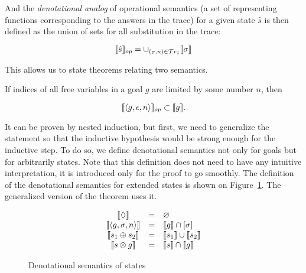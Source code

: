 And the \emph{denotational analog} of operational semantics (a set of representing functions corresponding to the answers in the trace) for a given state $\hat{s}$ is
then defined as the union of sets for all substitution in the trace:

\[
\llbracket{\hat{s}}\rrbracket_{op} = \cup_{(\sigma, n) \in \mathcal{T}r_{\hat{s}}} \llbracket{\sigma}\rrbracket
\]

\begin{comment}
In \textsc{Coq} we again use a proposition instead:

\begin{lstlisting}[language=Coq]
   Definition in_denotational_analog
      (t : trace) (f : repr_fun) : Prop :=
      exists s n, in_stream (Answer s n) t /\
             in_denotational_sem_subst s f.
   Notation "{| t , f |}" := (in_denotational_analog t f).
\end{lstlisting}
\end{comment}

This allows us to state theorems relating two semantics.

\begin{theorem}
\label{lem:soundness}
If indices of all free variables in a goal $g$ are limited by some number $n$, then

\[
\llbracket{\left<{g, \epsilon, n}\right>}\rrbracket_{op} \subset \llbracket{g}\rrbracket.
\]
\end{theorem}

It can be proven by nested induction, but first, we need to generalize the statement so that the inductive hypothesis would be strong enough for the inductive step.
To do so, we define denotational semantics not only for goals but for arbitrarily states. Note that this definition does not need to have any intuitive
interpretation, it is introduced only for the proof to go smoothly. The definition of the denotational semantics for extended states is shown on Figure~\ref{denotational_semantics_of_states}.
The generalized version of the theorem uses it.

\begin{figure}[t]
  \[
  \begin{array}{ccl}
    \llbracket{\Diamond}\rrbracket&=&\varnothing\\
    \llbracket{\left<{g, \sigma, n}\right>}\rrbracket&=&\llbracket{g}\rrbracket\cap[\sigma]\\
    \llbracket{s_1 \oplus s_2}\rrbracket&=&\llbracket{s_1}\rrbracket\cup\llbracket{s_2}\rrbracket\\
    \llbracket{s \otimes g}\rrbracket&=&\llbracket{s}\rrbracket\cap\llbracket{g}\rrbracket\\
  \end{array}
  \]
  \caption{Denotational semantics of states}
  \label{denotational_semantics_of_states}
\end{figure}

